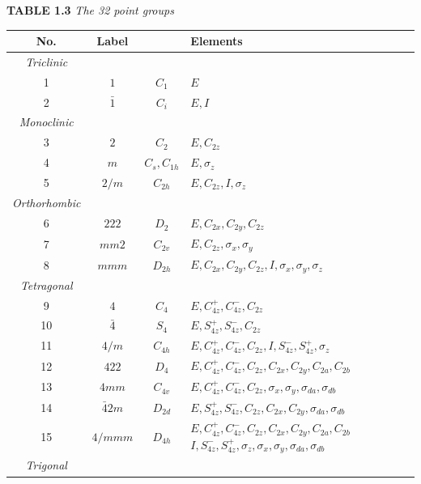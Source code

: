 \documentclass[11pt,a4paper,twoside,openright]{book}
\begin{document}
\begin{minipage}{\textwidth}
\centering\textbf{TABLE 1.3}
\textit{The 32 point groups}

\centering
\begin{tabular}{|c|c|c|p{}|}
\hline
No. & Label &  & Elements \\ \hline
\textit{Triclinic} &  &  &  \\ \hline
1 & $1$ & $C_{1}$ & $E$ \\ \hline
2 & $\bar{1}$ & $C_{i}$ & $E, I$ \\ \hline
\textit{Monoclinic} &  &  &  \\ \hline
3 & $2$ & $C_{2}$ & $E, C_{2z}$ \\ \hline
4 & $m$ & $C_{s}, C_{1h}$ & $E, \sigma_{z}$ \\ \hline
5 & $2/m$ & $C_{2h}$ & $E, C_{2z}, I, \sigma_{z}$ \\ \hline
\textit{Orthorhombic} &  &  &  \\ \hline
6 & $222$ & $D_{2}$ & $E, C_{2x}, C_{2y}, C_{2z}$ \\ \hline
7 & $mm2$ & $C_{2v}$ & $E, C_{2z}, \sigma_{x}, \sigma_{y}$ \\ \hline
8 & $mmm$ & $D_{2h}$ & $E, C_{2x}, C_{2y}, C_{2z}, I, \sigma_{x}, \sigma_{y}, \sigma_{z}$ \\ \hline
\textit{Tetragonal} &  &  &  \\ \hline
9 & $4$ & $C_{4}$ & $E, C_{4z}^{+}, C_{4z}^{-}, C_{2z}$ \\ \hline
10 & $\bar{4}$ & $S_{4}$ & $E, S_{4z}^{+}, S_{4z}^{-}, C_{2z}$ \\ \hline
11 & $4/m$ & $C_{4h}$ & $E, C_{4z}^{+}, C_{4z}^{-}, C_{2z}, I, S_{4z}^{-}, S_{4z}^{+}, \sigma_{z}$ \\ \hline
12 & $422$ & $D_{4}$ & $E, C_{4z}^{+}, C_{4z}^{-}, C_{2z}, C_{2x}, C_{2y}, C_{2a}, C_{2b}$ \\ \hline
13 & $4mm$ & $C_{4v}$ & $E, C_{4z}^{+}, C_{4z}^{-}, C_{2z}, \sigma_{x}, \sigma_{y}, \sigma_{da}, \sigma_{db}$ \\ \hline
14 & $\bar{4}2m$ & $D_{2d}$ & $E, S_{4z}^{+}, S_{4z}^{-}, C_{2z}, C_{2x}, C_{2y}, \sigma_{da}, \sigma_{db}$ \\ \hline
15 & $4/mmm$ & $D_{4h}$ & $E, C_{4z}^{+}, C_{4z}^{-}, C_{2z}, C_{2x}, C_{2y}, C_{2a}, C_{2b}$\newline $I, S_{4z}^{-}, S_{4z}^{+}, \sigma_{z}, \sigma_{x}, \sigma_{y}, \sigma_{da}, \sigma_{db}$ \\ \hline
\textit{Trigonal} &  &  &  \\ \hline

\end{tabular}
\end{minipage}
\end{document}

